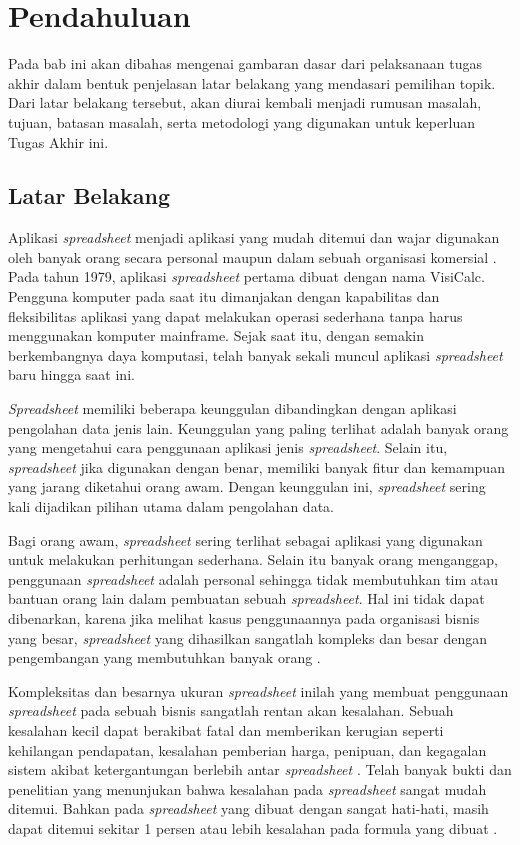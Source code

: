 \chapter{Pendahuluan}

Pada bab ini akan dibahas mengenai gambaran dasar dari pelaksanaan tugas akhir dalam bentuk penjelasan latar belakang yang mendasari pemilihan topik. Dari latar belakang tersebut, akan diurai kembali menjadi rumusan masalah, tujuan, batasan masalah, serta metodologi yang digunakan untuk keperluan Tugas Akhir ini.

\section{Latar Belakang}

Aplikasi \textit{spreadsheet} menjadi aplikasi yang mudah ditemui dan wajar digunakan oleh banyak orang secara personal maupun dalam sebuah organisasi komersial \parencite{Chan1996}. Pada tahun 1979, aplikasi \textit{spreadsheet} pertama dibuat dengan nama VisiCalc. Pengguna komputer pada saat itu dimanjakan dengan kapabilitas dan fleksibilitas aplikasi yang dapat melakukan operasi sederhana tanpa harus menggunakan komputer mainframe. Sejak saat itu, dengan semakin berkembangnya daya komputasi, telah banyak sekali muncul aplikasi \textit{spreadsheet} baru hingga saat ini.

\textit{Spreadsheet} memiliki beberapa keunggulan dibandingkan dengan aplikasi pengolahan data jenis lain. Keunggulan yang paling terlihat adalah banyak orang yang mengetahui cara penggunaan aplikasi jenis \textit{spreadsheet}. Selain itu, \textit{spreadsheet} jika digunakan dengan benar, memiliki banyak fitur dan kemampuan yang jarang diketahui orang awam. Dengan keunggulan ini, \textit{spreadsheet} sering kali dijadikan pilihan utama dalam pengolahan data.

Bagi orang awam, \textit{spreadsheet} sering terlihat sebagai aplikasi yang digunakan untuk melakukan perhitungan sederhana. Selain itu banyak orang menganggap, penggunaan \textit{spreadsheet} adalah personal sehingga tidak membutuhkan tim atau bantuan orang lain dalam pembuatan sebuah \textit{spreadsheet}. Hal ini tidak dapat dibenarkan, karena jika melihat kasus penggunaannya pada organisasi bisnis yang besar, \textit{spreadsheet} yang dihasilkan sangatlah kompleks dan besar dengan pengembangan yang membutuhkan banyak orang \parencite{Panko1998}.

Kompleksitas dan besarnya ukuran \textit{spreadsheet} inilah yang membuat penggunaan \textit{spreadsheet} pada sebuah bisnis sangatlah rentan akan kesalahan. Sebuah kesalahan kecil dapat berakibat fatal dan memberikan kerugian seperti kehilangan pendapatan, kesalahan pemberian harga, penipuan, dan kegagalan sistem akibat ketergantungan berlebih antar \textit{spreadsheet} \parencite{EUSPRIGAbout}. Telah banyak bukti dan penelitian yang menunjukan bahwa kesalahan pada \textit{spreadsheet} sangat mudah ditemui. Bahkan pada \textit{spreadsheet} yang dibuat dengan sangat hati-hati, masih dapat ditemui sekitar 1 persen atau lebih kesalahan pada formula yang dibuat \parencite{Panko1998}.

